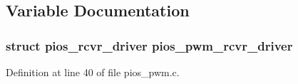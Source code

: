 \subsection{Variable Documentation}
\hypertarget{group___p_i_o_s___s_e_r_v_o_ga767a19a3a54afa71399b7467963690df}{
\subsubsection[{pios\-\_\-pwm\-\_\-rcvr\-\_\-driver}]{\setlength{\rightskip}{0pt plus 5cm}struct {\bf pios\-\_\-rcvr\-\_\-driver} pios\-\_\-pwm\-\_\-rcvr\-\_\-driver}}\label{group___p_i_o_s___s_e_r_v_o_ga767a19a3a54afa71399b7467963690df}


Definition at line 40 of file pios\-\_\-pwm.\-c.

